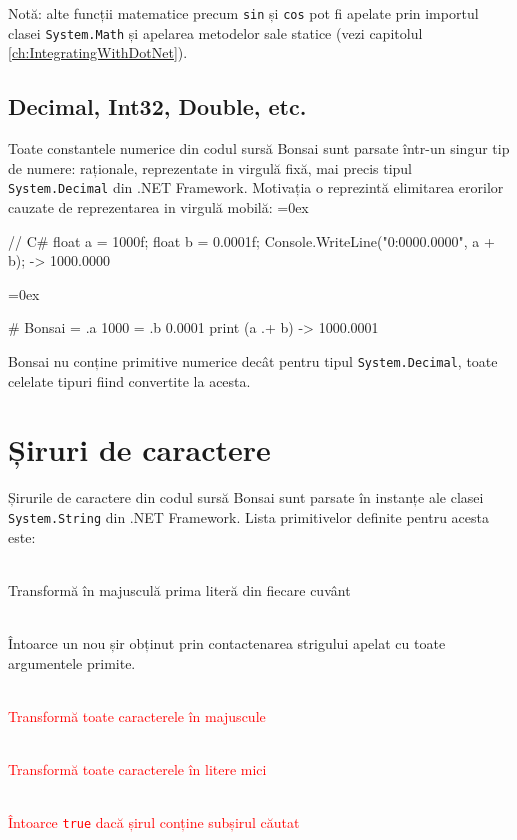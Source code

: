 \documentclass[12pt,a4paper]{memoir}
\newcommand{\draft}{\textcolor{red}}
\renewcommand{\c}{\texttt}
\newenvironment{code}
{
\definecolor{shadecolor}{gray}{0.91}
\topsep=0ex
\relax
\shaded
\verbatim
}
{
\endverbatim
\endshaded
}
\begin{document}
Notă: alte funcții matematice precum \c{sin} și \c{cos} pot fi apelate prin importul clasei \c{System.Math} și apelarea metodelor sale statice (vezi capitolul \ref{ch:IntegratingWithDotNet}).

\subsection{Decimal, Int32, Double, etc.}

Toate constantele numerice din codul sursă Bonsai sunt parsate într-un singur tip de numere: raționale, reprezentate in virgulă fixă, mai precis tipul \c{System.Decimal} din .NET Framework. Motivația o reprezintă elimitarea erorilor cauzate de reprezentarea in virgulă mobilă:
\begin{code}
// C#
float a = 1000f;
float b = 0.0001f;
Console.WriteLine("{0:0000.0000}", a + b);
  -> 1000.0000
\end{code}
\begin{code}
# Bonsai
= .a 1000
= .b 0.0001
print (a .+ b)
  -> 1000.0001
\end{code}

Bonsai nu conține primitive numerice decât pentru tipul \c{System.Decimal}, toate celelate tipuri fiind convertite la acesta.

\section{Șiruri de caractere}

Șirurile de caractere din codul sursă Bonsai sunt parsate în instanțe ale clasei \c{System.String} din .NET Framework. Lista primitivelor definite pentru acesta este:

\begin{description}
\item[\c{.capitalize}]\hfill\\Transformă în majusculă prima literă din fiecare cuvânt
\item[\c{.+}]\hfill\\Întoarce un nou șir obținut prin contactenarea strigului apelat cu toate argumentele primite.
\draft{
\item[\c{.upcase}]\hfill\\Transformă toate caracterele în majuscule
\item[\c{.downcase}]\hfill\\Transformă toate caracterele în litere mici
\item[\c{.contains}]\hfill\\Întoarce \texttt{true} dacă șirul conține subșirul căutat
}
\end{description}
\end{document}
